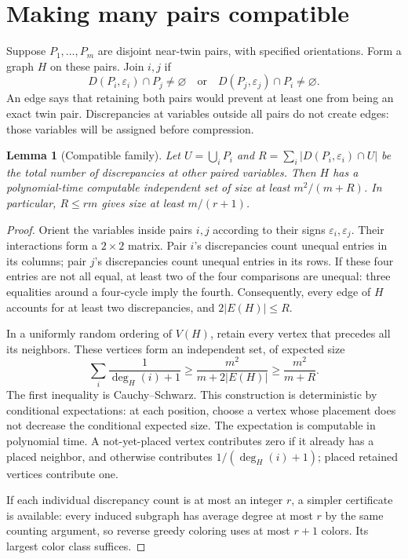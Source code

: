\documentclass[11pt,a4paper]{article}
\newtheorem{lemma}[theorem]{Lemma}
\begin{document}
\section{Making many pairs compatible}

Suppose $P_1,\ldots,P_m$ are disjoint near-twin pairs, with specified
orientations. Form a graph $H$ on these pairs. Join $i,j$ if
\[
 D(P_i,\varepsilon_i)\cap P_j\ne\varnothing
 \quad\text{or}\quad
 D(P_j,\varepsilon_j)\cap P_i\ne\varnothing.
\]
An edge says that retaining both pairs would prevent at least one from
being an exact twin pair. Discrepancies at variables outside all pairs
do not create edges: those variables will be assigned before compression.

\begin{lemma}[Compatible family]\label{lem:compatible}
Let $U=\bigcup_iP_i$ and
$R=\sum_i|D(P_i,\varepsilon_i)\cap U|$ be the total number of
discrepancies at other paired variables. Then $H$ has a polynomial-time
computable independent set of size at least
$m^2/(m+R)$. In particular, $R\le rm$ gives size at least $m/(r+1)$.
\end{lemma}
\begin{proof}
Orient the variables inside pairs $i,j$ according to their signs
$\varepsilon_i,\varepsilon_j$. Their interactions form a $2\times2$
matrix. Pair $i$'s discrepancies count unequal entries in its columns;
pair $j$'s discrepancies count unequal entries in its rows. If these
four entries are not all equal, at least two of the four comparisons
are unequal: three equalities around a four-cycle imply the fourth.
Consequently, every edge of $H$ accounts for at least two discrepancies,
and $2|E(H)|\le R$.

In a uniformly random ordering of $V(H)$, retain every vertex that
precedes all its neighbors. These vertices form an independent set,
of expected size
\[
 \sum_i\frac1{\deg_H(i)+1}
 \ge\frac{m^2}{m+2|E(H)|}\ge\frac{m^2}{m+R}.
\]
The first inequality is Cauchy--Schwarz. This construction is
deterministic by conditional expectations: at each position, choose a
vertex whose placement does not decrease the conditional expected
size. The expectation is computable in polynomial time. A not-yet-placed
vertex contributes zero if it already has a placed neighbor, and
otherwise contributes $1/(\deg_H(i)+1)$; placed retained vertices
contribute one.

If each individual discrepancy count is at most an integer $r$, a
simpler certificate is available: every induced subgraph has average
degree at most $r$ by the same counting argument, so reverse greedy
coloring uses at most $r+1$ colors. Its largest color class suffices.
\end{proof}
\end{document}
